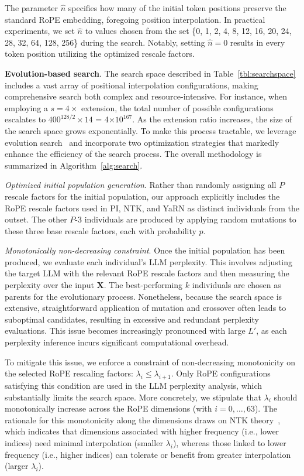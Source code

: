 The parameter $\hat{n}$ specifies how many of the initial token positions preserve the standard RoPE embedding, foregoing position interpolation. In practical experiments, we set $\hat{n}$ to values chosen from the set \{0, 1, 2, 4, 8, 12, 16, 20, 24, 28, 32, 64, 128, 256\} during the search. Notably, setting $\hat{n}=0$ results in every token position utilizing the optimized rescale factors.

\textbf{Evolution-based search}. The search space described in Table~\ref{tbl:searchspace} includes a vast array of positional interpolation configurations, making comprehensive search both complex and resource-intensive. For instance, when employing a $s=4\times$ extension, the total number of possible configurations escalates to $400^{128/2}\times14$ = 4$\times10^{167}$. As the extension ratio increases, the size of the search space grows exponentially. To make this process tractable, we leverage evolution search~\cite{guo2020single} and incorporate two optimization strategies that markedly enhance the efficiency of the search process. The overall methodology is summarized in Algorithm~\ref{alg:search}.

\textit{Optimized initial population generation}. Rather than randomly assigning all $P$ rescale factors for the initial population, our approach explicitly includes the RoPE rescale factors used in PI, NTK, and YaRN as distinct individuals from the outset. The other $P$-3 individuals are produced by applying random mutations to these three base rescale factors, each with probability $p$.

\textit{Monotonically non-decreasing constraint}. Once the initial population has been produced, we evaluate each individual's LLM perplexity. This involves adjusting the target LLM with the relevant RoPE rescale factors and then measuring the perplexity over the input $\mathbf{X}$. The best-performing $k$ individuals are chosen as parents for the evolutionary process. Nonetheless, because the search space is extensive, straightforward application of mutation and crossover often leads to suboptimal candidates, resulting in excessive and redundant perplexity evaluations. This issue becomes increasingly pronounced with large $L'$, as each perplexity inference incurs significant computational overhead.

To mitigate this issue, we enforce a constraint of non-decreasing monotonicity on the selected RoPE rescaling factors: $\lambda_i\le \lambda_{i+1}$. Only RoPE configurations satisfying this condition are used in the LLM perplexity analysis, which substantially limits the search space. More concretely, we stipulate that $\lambda_i$ should monotonically increase across the RoPE dimensions (with $i=0,\ldots,63$). The rationale for this monotonicity along the dimensions draws on NTK theory~\cite{jacot2018neural,tancik2020fourier,ntk}, which indicates that dimensions associated with higher frequency (i.e., lower indices) need minimal interpolation (smaller $\lambda_i$), whereas those linked to lower frequency (i.e., higher indices) can tolerate or benefit from greater interpolation (larger $\lambda_i$).

